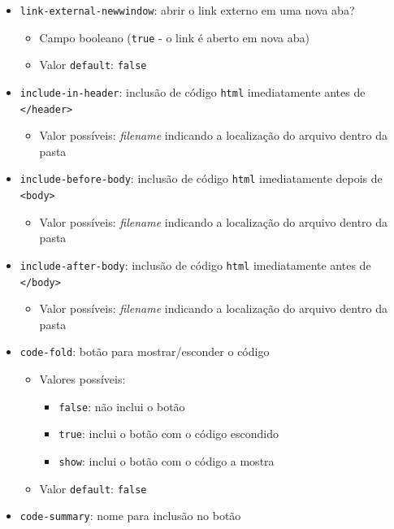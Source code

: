 \documentclass[
  10pt,
  ignorenonframetext,
]{beamer}
\providecommand{\tightlist}{%
  \setlength{\itemsep}{0pt}\setlength{\parskip}{0pt}}\usepackage{longtable,booktabs,array}
\begin{document}
\begin{frame}[fragile]
\begin{itemize}
\tightlist
\item
  \texttt{link-external-newwindow}: abrir o link externo em uma nova
  aba?

  \begin{itemize}
  \tightlist
  \item
    Campo booleano (\texttt{true} - o link é aberto em nova aba)
  \item
    Valor \texttt{default}: \texttt{false}
  \end{itemize}
\item
  \texttt{include-in-header}: inclusão de código \texttt{html}
  imediatamente antes de \texttt{\textless{}/header\textgreater{}}

  \begin{itemize}
  \tightlist
  \item
    Valor possíveis: \emph{filename} indicando a localização do arquivo
    dentro da pasta
  \end{itemize}
\item
  \texttt{include-before-body}: inclusão de código \texttt{html}
  imediatamente depois de \texttt{\textless{}body\textgreater{}}

  \begin{itemize}
  \tightlist
  \item
    Valor possíveis: \emph{filename} indicando a localização do arquivo
    dentro da pasta
  \end{itemize}
\item
  \texttt{include-after-body}: inclusão de código \texttt{html}
  imediatamente antes de \texttt{\textless{}/body\textgreater{}}

  \begin{itemize}
  \tightlist
  \item
    Valor possíveis: \emph{filename} indicando a localização do arquivo
    dentro da pasta
  \end{itemize}
\item
  \texttt{code-fold}: botão para mostrar/esconder o código

  \begin{itemize}
  \tightlist
  \item
    Valores possíveis:

    \begin{itemize}
    \tightlist
    \item
      \texttt{false}: não inclui o botão
    \item
      \texttt{true}: inclui o botão com o código escondido
    \item
      \texttt{show}: inclui o botão com o código a mostra
    \end{itemize}
  \item
    Valor \texttt{default}: \texttt{false}
  \end{itemize}
\item
  \texttt{code-summary}: nome para inclusão no botão


\end{itemize}
\end{frame}
\end{document}
